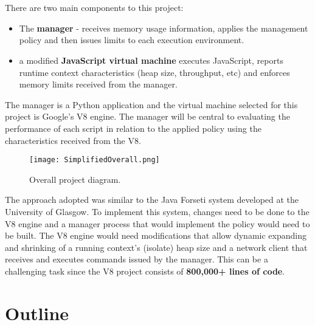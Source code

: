 \documentclass{l4proj}
\begin{document}
\\\\
There are two main components to this project:
\begin{itemize}
\item The \textbf{manager} - receives memory usage information, applies the management policy and then issues limits to each execution environment.
\item a modified \textbf{JavaScript virtual machine} executes JavaScript, reports runtime context characteristics (heap size, throughput, etc) and enforces memory limits received from the manager.
\end{itemize}
The manager is a Python application and the virtual machine selected for this project is Google's V8 engine. The manager will be central to evaluating the performance of each script in relation to the applied policy using the characteristics received from the V8.

\begin{figure}[!ht]
  \centering
    \texttt{[image: SimplifiedOverall.png]}
    \caption{Overall project diagram.}
\end{figure}

The approach adopted was similar to the Java Forseti system developed at the University of Glasgow\cite{forseti}. To implement this system, changes need to be done to the V8 engine and a manager process that would implement the policy would need to be built. The V8 engine would need modifications that allow dynamic expanding and shrinking of a running context's (isolate) heap size and a network client that receives and executes commands issued by the manager. This can be a challenging task since the V8 project consists of \textbf{800,000+ lines of code}. %

\section{Outline}
\end{document}
